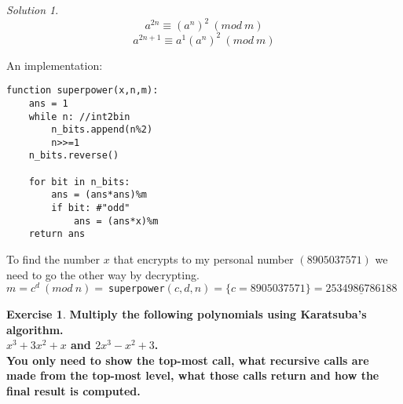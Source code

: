 \documentclass[a4paper,twoside=false,abstract=false,numbers=noenddot,
titlepage=false,headings=small,parskip=half,version=last]{scrartcl}
\theoremstyle{definition}
\newtheorem{exercise}{Exercise}
\theoremstyle{remark}
\newtheorem*{solution}{Solution}
\begin{document}
\begin{solution}
\begin{equation}
    a^{2n} \equiv (a^n)^2 \ ( mod \ m)
\end{equation}
\begin{equation}
    a^{2n+1} \equiv a^1(a^n)^2 \ ( mod \ m )
\end{equation}

An implementation:
\begin{verbatim}
function superpower(x,n,m):
    ans = 1
    while n: //int2bin
        n_bits.append(n%2)
        n>>=1
    n_bits.reverse()

    for bit in n_bits:
        ans = (ans*ans)%m 
        if bit: #"odd"
            ans = (ans*x)%m
    return ans
\end{verbatim}

To find the number $x$ that encrypts to my personal number $(8905037571)$ we
need to go the other way by decrypting. \\
$m=c^d \ (mod \ n) =\
$\verb+superpower+$(c,d,n)=\{c=8905037571\}=\underline{2534986786188}$

\end{solution}
\clearpage
\begin{exercise}
{\bf
Multiply the following polynomials using Karatsuba's algorithm.\\
$x^3+3x^2+x$ and $2x^3-x^2+3$.\\
You only need to show the top-most call, what recursive calls are made from the
top-most level, what those calls return and how the final result is computed.
}
\end{exercise}
\end{document}
